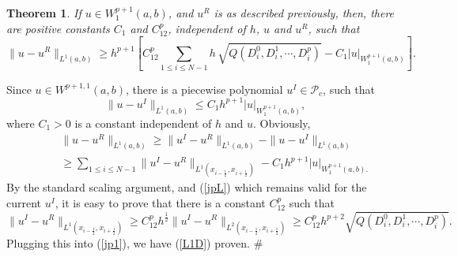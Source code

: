 \documentclass{article}
\newtheorem{theorem}{Theorem}[section]
\numberwithin{equation}{section}
\begin{document}
\begin{spacing}{1.15}
\begin{theorem} \label{T1}
If $u \in W^{p+1}_{1}(a,b)$, and $u^R$ is as described previously,
then, there are positive constants $C_1$ and $C_{12}^p$, independent
of $h$, $u$ and $u^R$, such that
\begin{equation} \label{L1D}
\|u - u^R\|_{L^1(a,b)} \ge  h^{p+1} \left[ C_{12}^p \sum_{1\le i \le
N-1} h \,\sqrt{ Q(D^0_i,D^1_i,\cdots,D^p_i)} - C_1
|u|_{W^{p+1}_{1}(a,b)} \right].
\end{equation}
\end{theorem}
 Since $u \in W^{p+1,1}(a,b)$, there is a
piecewise polynomial $u^I \in {\mathcal P}_c$, such that
$$
\|u-u^I\|_{L^1 (a,b)} \le  C_1 h^{p+1} |u|_{W^{p+1}_{1}(a,b)},
$$
where $C_1 >0$ is a constant independent of $h$ and $u$. Obviously,
\begin{eqnarray}
&& \|u-u^R\|_{L^1 (a,b)} \ge \|u^I-u^R\|_{L^1 (a,b)} - \|u-u^I\|_{L^1 (a,b)} \nonumber \\
&& \ge  \sum_{1 \le i \le N-1} \|u^I-u^R\|_{L^1
(x_{i-\frac{1}{2}},x_{i+\frac{1}{2}})}  - C_1 h^{p+1}
|u|_{W^{p+1}_{1}(a,b).} \label{jp1}
\end{eqnarray}
By the standard scaling argument, and (\ref{jpL}) which remains valid for the current $u^I$, it is easy to
prove that there is a constant $C_{12}^p$ such that
$$
\|u^I-u^R\|_{L^1 (x_{i-\frac{1}{2}},x_{i+\frac{1}{2}})} \ge C_{12}^p
h^{\frac{1}{2}} \|u^I-u^R\|_{L^2
(x_{i-\frac{1}{2}},x_{i+\frac{1}{2}})} \ge C_{12}^p h^{p+2}
\sqrt{Q(D^0_i,D^1_i,\cdots,D^p_i)}.
$$
Plugging this into (\ref{jp1}), we have (\ref{L1D}) proven. \#


\end{spacing}
\end{document}

